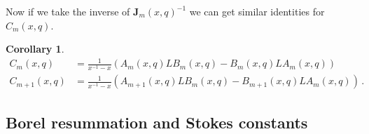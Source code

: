\documentclass[12pt,reqno]{amsart}
\theoremstyle{definition}
\newtheorem{corollary}[theorem]{Corollary}
\def\bJ{\mathbf J}
\begin{document}
Now if we take the inverse of $\bJ_{m}(x,q)^{-1}$ we can get similar identities for
$C_{m}(x,q)$.
\begin{corollary}
\begin{align}
\label{Cm}  
C_{m}(x,q)&=
\frac{1}{x^{-1}-x}\left(A_{m}(x,q)LB_{m}(x,q)-B_{m}(x,q)LA_{m}(x,q)\right)\\
\label{Cmp1}  
C_{m+1}(x,q)&=
\frac{1}{x^{-1}-x}\left(A_{m+1}(x,q)LB_{m}(x,q)-B_{m+1}(x,q)LA_{m}(x,q)\right)\,.
\end{align}
\end{corollary}

\subsection{Borel resummation and Stokes constants}
\label{sub.41borelx}
\end{document}
